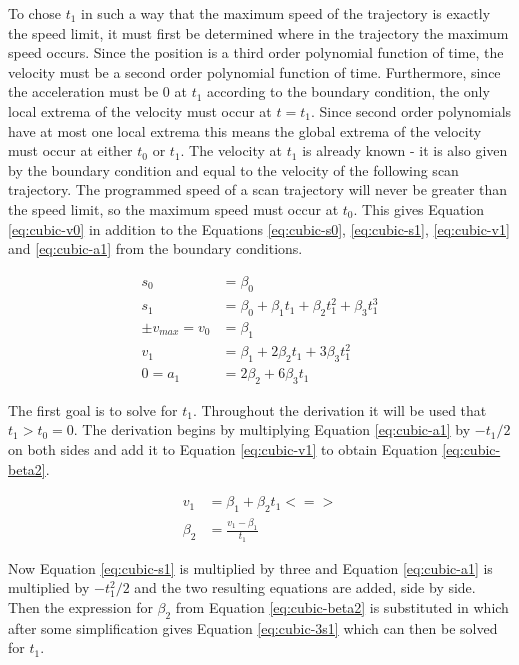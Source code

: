 To chose $t_1$ in such a way that the maximum speed of the trajectory is exactly the speed limit, it must first be determined where in the trajectory the maximum speed occurs. Since the position is a third order polynomial function of time, the velocity must be a second order polynomial function of time. Furthermore, since the acceleration must be 0 at $t_1$ according to the boundary condition, the only local extrema of the velocity must occur at $t=t_1$. Since second order polynomials have at most one local extrema this means the global extrema of the velocity must occur at either $t_0$ or $t_1$. The velocity at $t_1$ is already known - it is also given by the boundary condition and equal to the velocity of the following scan trajectory. The programmed speed of a scan trajectory will never be greater than the speed limit, so the maximum speed must occur at $t_0$. This gives Equation \ref{eq:cubic-v0} in addition to the Equations \ref{eq:cubic-s0}, \ref{eq:cubic-s1}, \ref{eq:cubic-v1} and \ref{eq:cubic-a1} from the boundary conditions.

\begin{align}
    s_0 &= \beta_0 \label{eq:cubic-s0}\\
    s_1 &= \beta_0 + \beta_1 t_1 + \beta_2 t_1^2 + \beta_3 t_1^3 \label{eq:cubic-s1}\\
    \pm v_{max} = v_0 &= \beta_1 \label{eq:cubic-v0}\\
    v_1 &= \beta_1 + 2\beta_2 t_1 + 3 \beta_3 t_1^2 \label{eq:cubic-v1} \\
    0 = a_1 &= 2\beta_2 + 6\beta_3 t_1 \label{eq:cubic-a1}
\end{align}

The first goal is to solve for $t_1$. Throughout the derivation it will be used that $t_1 > t_0 = 0$.
The derivation begins by multiplying Equation \ref{eq:cubic-a1} by $-t_1/2$ on both sides and add it to Equation \ref{eq:cubic-v1} to obtain Equation \ref{eq:cubic-beta2}.

\begin{align}
    v_1 &= \beta_1 + \beta_2 t_1 <=> \\
    \beta_2 &= \frac{v_1 - \beta_1}{t_1} \label{eq:cubic-beta2}
\end{align}

Now Equation \ref{eq:cubic-s1} is multiplied by three and Equation \ref{eq:cubic-a1} is multiplied by $-t_1^2/2$ and the two resulting equations are added, side by side. Then the expression for $\beta_2$ from Equation \ref{eq:cubic-beta2} is substituted in which after some simplification gives Equation \ref{eq:cubic-3s1} which can then be solved for $t_1$.

